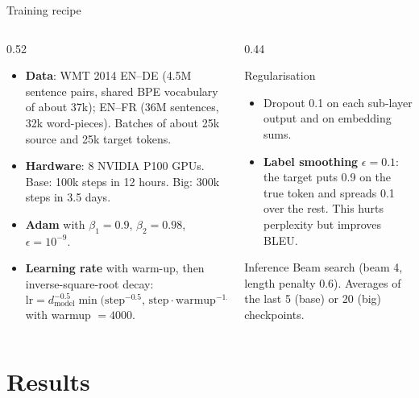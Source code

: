 \documentclass[aspectratio=169,11pt]{beamer}
\begin{document}
\begin{frame}{Training recipe}
  \begin{columns}[T]
    \begin{column}{0.52\textwidth}
      \small
      \begin{itemize}
        \item \textbf{Data}: WMT 2014 EN--DE (4.5M sentence pairs, shared BPE vocabulary of about 37k); EN--FR (36M sentences, 32k word-pieces). Batches of about 25k source and 25k target tokens.
        \item \textbf{Hardware}: 8 NVIDIA P100 GPUs. Base: 100k steps in 12 hours. Big: 300k steps in 3.5 days.
        \item \textbf{Adam} with $\beta_1=0.9$, $\beta_2=0.98$, $\epsilon=10^{-9}$.
        \item \textbf{Learning rate} with warm-up, then inverse-square-root decay:
        \[
          \text{lr}=d_{\text{model}}^{-0.5}\min\!\big(\text{step}^{-0.5},\,\text{step}\cdot\text{warmup}^{-1.5}\big)
        \]
        with warmup $=4000$.
      \end{itemize}
    \end{column}
    \begin{column}{0.44\textwidth}
      \begin{block}{Regularisation}
        \small
        \begin{itemize}
          \item Dropout 0.1 on each sub-layer output and on embedding sums.
          \item \textbf{Label smoothing} $\epsilon=0.1$: the target puts 0.9 on the true token and spreads 0.1 over the rest. This hurts perplexity but improves BLEU.
        \end{itemize}
      \end{block}
      \begin{exampleblock}{Inference}
        \small
        Beam search (beam 4, length penalty 0.6). Averages of the last 5 (base) or 20 (big) checkpoints.
      \end{exampleblock}
    \end{column}
  \end{columns}
\end{frame}

\section{Results}
\end{document}
